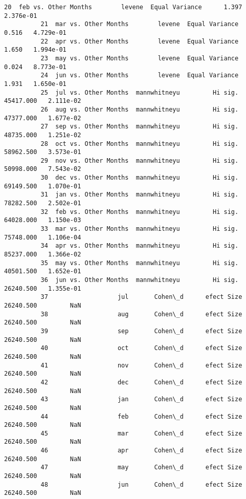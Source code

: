 \documentclass[11pt]{article}
\begin{document}
\begin{Verbatim}[commandchars=\\\{\}]
          20  feb vs. Other Months        levene  Equal Variance      1.397   2.376e-01   
          21  mar vs. Other Months        levene  Equal Variance      0.516   4.729e-01   
          22  apr vs. Other Months        levene  Equal Variance      1.650   1.994e-01   
          23  may vs. Other Months        levene  Equal Variance      0.024   8.773e-01   
          24  jun vs. Other Months        levene  Equal Variance      1.931   1.650e-01   
          25  jul vs. Other Months  mannwhitneyu         Hi sig.  45417.000   2.111e-02   
          26  aug vs. Other Months  mannwhitneyu         Hi sig.  47377.000   1.677e-02   
          27  sep vs. Other Months  mannwhitneyu         Hi sig.  48735.000   1.251e-02   
          28  oct vs. Other Months  mannwhitneyu         Hi sig.  58962.500   3.573e-01   
          29  nov vs. Other Months  mannwhitneyu         Hi sig.  50998.000   7.543e-02   
          30  dec vs. Other Months  mannwhitneyu         Hi sig.  69149.500   1.070e-01   
          31  jan vs. Other Months  mannwhitneyu         Hi sig.  78282.500   2.502e-01   
          32  feb vs. Other Months  mannwhitneyu         Hi sig.  64028.000   1.150e-03   
          33  mar vs. Other Months  mannwhitneyu         Hi sig.  75748.000   1.106e-04   
          34  apr vs. Other Months  mannwhitneyu         Hi sig.  85237.000   1.366e-02   
          35  may vs. Other Months  mannwhitneyu         Hi sig.  40501.500   1.652e-01   
          36  jun vs. Other Months  mannwhitneyu         Hi sig.  26240.500   1.355e-01   
          37                   jul       Cohen\_d      efect Size  26240.500         NaN   
          38                   aug       Cohen\_d      efect Size  26240.500         NaN   
          39                   sep       Cohen\_d      efect Size  26240.500         NaN   
          40                   oct       Cohen\_d      efect Size  26240.500         NaN   
          41                   nov       Cohen\_d      efect Size  26240.500         NaN   
          42                   dec       Cohen\_d      efect Size  26240.500         NaN   
          43                   jan       Cohen\_d      efect Size  26240.500         NaN   
          44                   feb       Cohen\_d      efect Size  26240.500         NaN   
          45                   mar       Cohen\_d      efect Size  26240.500         NaN   
          46                   apr       Cohen\_d      efect Size  26240.500         NaN   
          47                   may       Cohen\_d      efect Size  26240.500         NaN   
          48                   jun       Cohen\_d      efect Size  26240.500         NaN   
          

\end{Verbatim}
\end{document}
